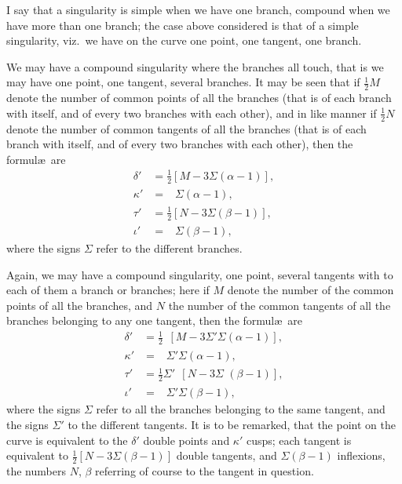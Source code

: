 \documentclass[11pt,a4paper]{article}
\begin{document}
\vspace{12pt}

\noindent
I say that a singularity is simple when we have one branch, compound when we have more than one branch; the case above considered is that of a simple singularity, viz.~we have on the curve one point, one tangent, one branch.

We may have a compound singularity where the branches all touch, that is we may have one point, one tangent, several branches. It may be seen that if $\tfrac{1}{2}M$ denote the number of common points of all the branches (that is of each branch with itself, and of every two branches with each other), and in like manner if $\tfrac{1}{2}N$ denote the number of common tangents of all the branches (that is of each branch with itself, and of every two branches with each other), then the formul\ae\ are
\begin{align*}
\delta' &= \tfrac{1}{2}[M - 3\Sigma(\alpha - 1)],\\
\kappa' &= \phantom{\tfrac{1}{2}[}\Sigma(\alpha - 1),\\
\tau' &= \tfrac{1}{2}[N - 3\Sigma(\beta - 1)],\\
\iota' &= \phantom{\tfrac{1}{2}[}\Sigma(\beta - 1),
\end{align*}
where the signs $\Sigma$ refer to the different branches.

Again, we may have a compound singularity, one point, several tangents with to each of them a branch or branches; here if $M$ denote the number of the common points of all the branches, and $N$ the number of the common tangents of all the branches belonging to any one tangent, then the formul\ae\ are
\begin{align*}
\delta' &= \tfrac{1}{2}\,\phantom{'}[M - 3\Sigma'\Sigma(\alpha - 1)],\\
\kappa' &= \phantom{\tfrac{1}{2}[}\Sigma'\Sigma(\alpha - 1),\\
\tau' &= \tfrac{1}{2}\Sigma'\,\phantom{[}[N - 3\Sigma\phantom{'}(\beta - 1)],\\
\iota' &= \phantom{\tfrac{1}{2}[}\Sigma'\Sigma(\beta - 1),
\end{align*}
where the signs $\Sigma$ refer to all the branches belonging to the same tangent, and the signs $\Sigma'$ to the different tangents. It is to be remarked, that the point on the curve is equivalent to the $\delta'$ double points and $\kappa'$ cusps; each tangent is equivalent to $\tfrac{1}{2}[N - 3\Sigma(\beta - 1)]$ double tangents, and $\Sigma(\beta - 1)$ inflexions, the numbers $N$, $\beta$ referring of course to the tangent in question.
\end{document}
